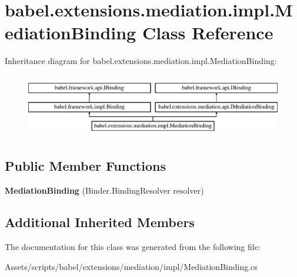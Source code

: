 \hypertarget{classbabel_1_1extensions_1_1mediation_1_1impl_1_1_mediation_binding}{\section{babel.\-extensions.\-mediation.\-impl.\-Mediation\-Binding Class Reference}
\label{classbabel_1_1extensions_1_1mediation_1_1impl_1_1_mediation_binding}
}
Inheritance diagram for babel.\-extensions.\-mediation.\-impl.\-Mediation\-Binding\-:\begin{figure}[H]
\begin{center}
\leavevmode
\includegraphics[height=2.818792cm]{classbabel_1_1extensions_1_1mediation_1_1impl_1_1_mediation_binding}
\end{center}
\end{figure}
\subsection*{Public Member Functions}
\begin{DoxyCompactItemize}
\item 
\hypertarget{classbabel_1_1extensions_1_1mediation_1_1impl_1_1_mediation_binding_a03df0ea5e9aaf2192ec43da77a919226}{{\bfseries Mediation\-Binding} (Binder.\-Binding\-Resolver resolver)}\label{classbabel_1_1extensions_1_1mediation_1_1impl_1_1_mediation_binding_a03df0ea5e9aaf2192ec43da77a919226}

\end{DoxyCompactItemize}
\subsection*{Additional Inherited Members}


The documentation for this class was generated from the following file\-:\begin{DoxyCompactItemize}
\item 
Assets/scripts/babel/extensions/mediation/impl/Mediation\-Binding.\-cs\end{DoxyCompactItemize}
